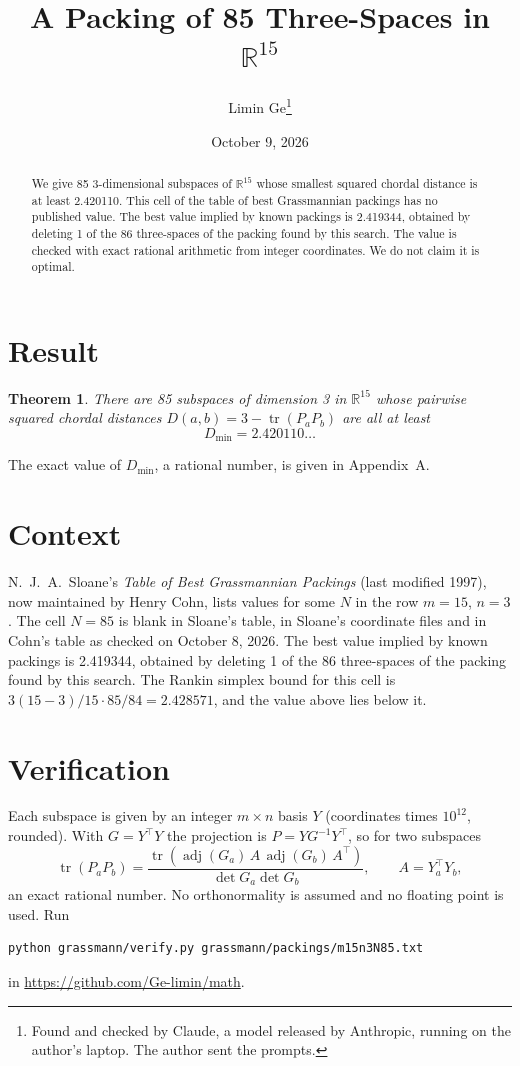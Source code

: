 \documentclass[11pt,a4paper]{article}
\title{A Packing of 85 Three-Spaces in $\mathbb{R}^{15}$}
\author{Limin Ge\thanks{Found and checked by Claude, a model released by Anthropic, running on the author's laptop. The author sent the prompts.}}
\date{October 9, 2026}
\newtheorem*{theorem}{Theorem}
\begin{document}
\maketitle
\begin{abstract}
We give 85 3-dimensional subspaces of $\mathbb{R}^{15}$ whose smallest squared chordal distance is at least 2.420110. This cell of the table of best Grassmannian packings has no published value. The best value implied by known packings is 2.419344, obtained by deleting 1 of the 86 three-spaces of the packing found by this search. The value is checked with exact rational arithmetic from integer coordinates. We do not claim it is optimal.
\end{abstract}

\section{Result}
\begin{theorem}
There are 85 subspaces of dimension 3 in $\mathbb{R}^{15}$ whose pairwise squared chordal distances $D(a,b) = 3 - \operatorname{tr}(P_aP_b)$ are all at least
\[ D_{\min} = 2.420110\ldots \]
\end{theorem}
The exact value of $D_{\min}$, a rational number, is given in Appendix~A.


\section{Context}
N.~J.~A.~Sloane's \emph{Table of Best Grassmannian Packings} (last modified 1997), now maintained by Henry Cohn, lists values for some $N$ in the row $m=15$, $n=3$. The cell $N=85$ is blank in Sloane's table, in Sloane's coordinate files and in Cohn's table as checked on October 8, 2026. The best value implied by known packings is 2.419344, obtained by deleting 1 of the 86 three-spaces of the packing found by this search. The Rankin simplex bound for this cell is $3(15-3)/15\cdot 85/84 = 2.428571$, and the value above lies below it.


\section{Verification}
Each subspace is given by an integer $m\times n$ basis $Y$ (coordinates times $10^{12}$, rounded). With $G=Y^\top Y$ the projection is $P=YG^{-1}Y^\top$, so for two subspaces
\[ \operatorname{tr}(P_aP_b)=\frac{\operatorname{tr}(\operatorname{adj}(G_a)\,A\,\operatorname{adj}(G_b)\,A^\top)}{\det G_a\det G_b},\qquad A=Y_a^\top Y_b, \]
an exact rational number. No orthonormality is assumed and no floating point is used. Run
\begin{verbatim}
python grassmann/verify.py grassmann/packings/m15n3N85.txt
\end{verbatim}
in \url{https://github.com/Ge-limin/math}.
\end{document}
